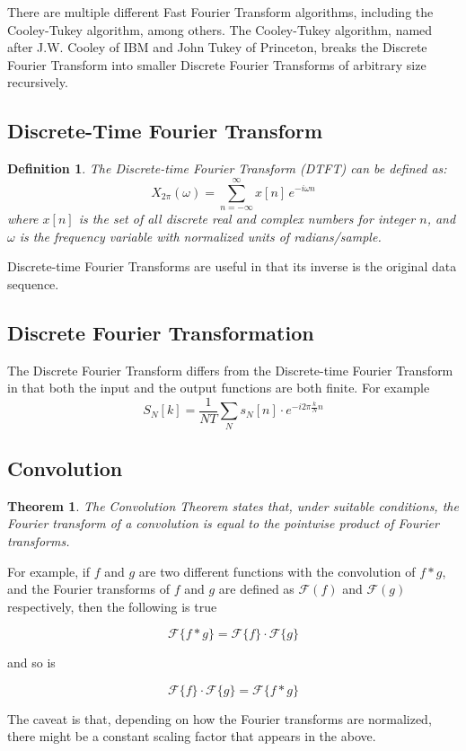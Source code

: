 \documentclass{article}
\newtheorem{theorem}{Theorem}
\newtheorem{definition}{Definition}
\begin{document}
There are multiple different Fast Fourier Transform algorithms, including the Cooley-Tukey algorithm, among others. The Cooley-Tukey algorithm, named after J.W. Cooley of IBM and John Tukey of Princeton, breaks the Discrete Fourier Transform into smaller Discrete Fourier Transforms of arbitrary size recursively.\cite{WikiFFT}
\subsection{Discrete-Time Fourier Transform}
\begin{definition}
	The {\em Discrete-time Fourier Transform (DTFT)} can be defined as:
	$$X_{2\pi}(\omega) = \sum_{n=-\infty}^{\infty} x[n] \,e^{-i \omega n}$$
	where $x[n]$ is the set of all discrete real and complex numbers for integer $n$, and $\omega$ is the frequency variable with normalized units of radians/sample.\cite{UBC}
\end{definition}

Discrete-time Fourier Transforms are useful in that its inverse is the original data sequence.
\subsection{Discrete Fourier Transformation}
The Discrete Fourier Transform differs from the Discrete-time Fourier Transform in that both the input and the output functions are both finite. For example
$$S_N[k] =\frac{1}{NT} \sum_N s_N[n]\cdot e^{-i 2\pi \frac{k}{N} n}$$
\subsection{Convolution}
\begin{theorem}
	The Convolution Theorem states that, under suitable conditions, the Fourier transform of a convolution is equal to the pointwise product of Fourier transforms.\cite{Convolution}
\end{theorem}

For example, if $f$ and $g$ are two different functions with the convolution of $f*g$, and the Fourier transforms of $f$ and $g$ are defined as $\mathcal{F}(f)$ and $\mathcal{F}(g)$ respectively, then the following is true

$$\mathcal{F}\{f*g\} = \mathcal{F}\{f\} \cdot \mathcal{F}\{g\}$$

and so is 

$$\mathcal{F}\{f\} \cdot \mathcal{F}\{g\} = \mathcal{F}\{f*g\}$$

The caveat is that, depending on how the Fourier transforms are normalized, there might be a constant scaling factor that appears in the above. \cite{Convolution}
\end{document}

